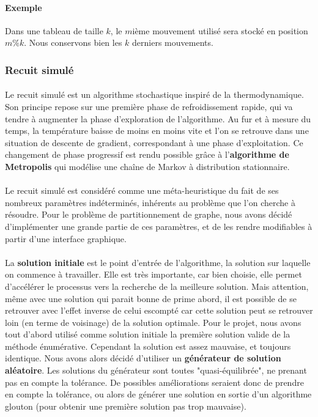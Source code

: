 \documentclass[12pt]{article}
\begin{document}
\paragraph{Exemple} Dans une tableau de taille $k$, le $m$ième mouvement utilisé sera stocké en position $m\%k$. Nous conservons bien les $k$ derniers mouvements.


\subsubsection{Recuit simulé}

\paragraph{}Le recuit simulé est un algorithme stochastique inspiré de la thermodynamique. Son principe repose sur une première phase de refroidissement rapide, qui va tendre à augmenter la phase d'exploration de l'algorithme. Au fur et à mesure du temps, la température baisse de moins en moins vite et l'on se retrouve dans une situation de descente de gradient, correspondant à une phase d'exploitation. Ce changement de phase progressif est rendu possible grâce à l'\textbf{algorithme de Metropolis} qui modélise une chaîne de Markov à distribution stationnaire.

\paragraph{}Le recuit simulé est considéré comme une méta-heuristique du fait de ses nombreux paramètres indéterminés, inhérents au problème que l'on cherche à résoudre. Pour le problème de partitionnement de graphe, nous avons décidé d'implémenter une grande partie de ces paramètres, et de les rendre modifiables à partir d'une interface graphique.

\paragraph{}La \textbf{solution initiale} est le point d'entrée de l'algorithme, la solution sur laquelle on commence à travailler. Elle est très importante, car bien choisie, elle permet d'accélérer le processus vers la recherche de la meilleure solution. Mais attention, même avec une solution qui parait bonne de prime abord, il est possible de se retrouver avec l'effet inverse de celui escompté car cette solution peut se retrouver loin (en terme de voisinage) de la solution optimale. Pour le projet, nous avons tout d'abord utilisé comme solution initiale la première solution valide de la méthode énumérative. Cependant la solution est assez mauvaise, et toujours identique. Nous avons alors décidé d'utiliser un \textbf{générateur de solution aléatoire}. Les solutions du générateur sont toutes "quasi-équilibrée", ne prenant pas en compte la tolérance. De possibles améliorations seraient donc de prendre en compte la tolérance, ou alors de générer une solution en sortie d'un algorithme glouton (pour obtenir une première solution pas trop mauvaise).
\end{document}
